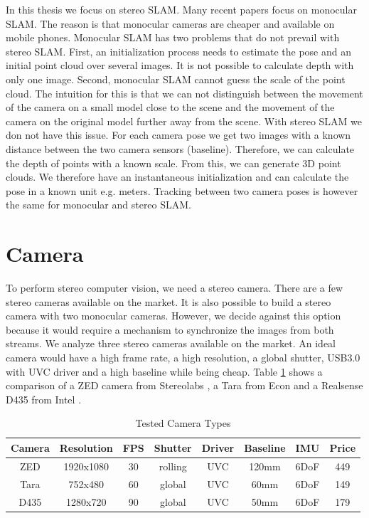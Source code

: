 \documentclass[11pt,a4paper,titlepage,oneside]{report}
\begin{document}
In this thesis we focus on stereo SLAM. Many recent papers focus on monocular SLAM. The reason is that monocular cameras are cheaper and available on mobile phones. Monocular SLAM has two problems that do not prevail with stereo SLAM. First, an initialization process needs to estimate the pose and an initial point cloud over several images. It is not possible to calculate depth with only one image. Second, monocular SLAM cannot guess the scale of the point cloud. The intuition for this is that we can not distinguish between the movement of the camera on a small model close to the scene and the movement of the camera on the original model further away from the scene. With stereo SLAM we don not have this issue. For each camera pose we get two images with a known distance between the two camera sensors (baseline). Therefore, we can calculate the depth of points with a known scale. From this, we can generate 3D point clouds. We therefore have an instantaneous initialization and can calculate the pose in a known unit e.g. meters. Tracking between two camera poses is however the same for monocular and stereo SLAM.

\section{Camera}

To perform stereo computer vision, we need a stereo camera. There are a few stereo cameras available on the market. It is also possible to build a stereo camera with two monocular cameras. However, we decide against this option because it would require a mechanism to synchronize the images from both streams. We analyze three stereo cameras available on the market. An ideal camera would have a high frame rate, a high resolution, a global shutter, USB3.0 with UVC driver and a high baseline while being cheap. Table \ref{tab:cameras} shows a comparison of a ZED camera from Stereolabs \cite{zed}, a Tara from Econ \cite{tara} and a Realsense D435 from Intel \cite{realsense}.

\tiny
\begin{table}[H]
  \centering
  \begin{tabular}{|c|c|c|c|c|c|c|c|}
  Camera & Resolution & FPS & Shutter & Driver & Baseline & IMU & Price \\
  \hline
  ZED & 1920x1080 & 30 & rolling &  UVC & 120mm & 6DoF & 449\\
  Tara & 752x480& 60 & global &  UVC &  60mm & 6DoF & 149\\
  D435 & 1280x720& 90 & global & UVC &  50mm & 6DoF & 179\\
\end{tabular}
\caption{Tested Camera Types}
\label{tab:cameras}
\end{table}
\normalsize
\end{document}
